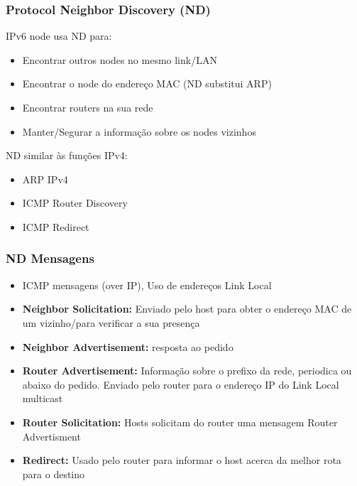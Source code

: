 \documentclass[../resumosRCOM.tex]{subfiles}
\begin{document}
\subsubsection{Protocol Neighbor Discovery (ND)}
IPv6 node usa ND para: 
\begin{itemize}
    \item Encontrar outros nodes no mesmo link/LAN
    \item Encontrar o node do endereço MAC (ND substitui ARP)
    \item Encontrar routers na sua rede
    \item Manter/Segurar a informação sobre os nodes vizinhos
\end{itemize}

ND similar às funções IPv4:
\begin{itemize}
    \item ARP IPv4
    \item ICMP Router Discovery
    \item ICMP Redirect
\end{itemize}

\subsubsection{ND Mensagens}
\begin{itemize}
    \item ICMP mensagens (over IP), Uso de endereços Link Local
    \item \textbf{Neighbor Solicitation: } Enviado pelo host para obter o endereço MAC de um vizinho/para verificar a sua presença
    \item \textbf{Neighbor Advertisement: } resposta ao pedido
    \item \textbf{Router Advertisement: } Informação sobre o prefixo da rede, periodica ou abaixo do pedido. Enviado pelo router para o endereço IP do Link Local multicast
    \item \textbf{Router Solicitation: } Hosts solicitam do router uma mensagem Router Advertisment
    \item \textbf{Redirect: } Usado pelo router para informar o host acerca da melhor rota para o destino
\end{itemize}
\end{document}
